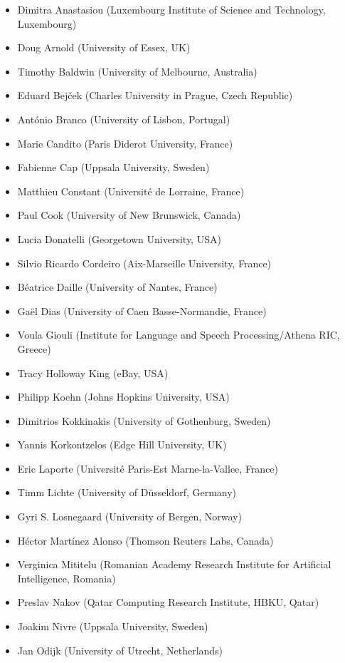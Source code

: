\documentclass[output=paper,
modfonts,
]{langscibook}
\begin{document}
\begin{itemize}
\item Dimitra Anastasiou (Luxembourg Institute of Science and Technology, Luxembourg)
\item Doug Arnold (University of Essex, UK)
\item Timothy Baldwin (University of Melbourne, Australia)
\item Eduard Bejček (Charles University in Prague, Czech Republic)
\item António Branco (University of Lisbon, Portugal)
\item Marie Candito (Paris Diderot University, France)
\item Fabienne Cap (Uppsala University, Sweden)
\item Matthieu Constant (Université de Lorraine, France)
\item Paul Cook (University of New Brunswick, Canada)
\item Lucia Donatelli (Georgetown University, USA)
\item Silvio Ricardo Cordeiro (Aix-Marseille University, France)
\item Béatrice Daille (University of Nantes, France)
\item Gaël Dias (University of Caen Basse-Normandie, France)
\item Voula Giouli (Institute for Language and Speech Processing/Athena RIC, Greece)
\item Tracy Holloway King (eBay, USA)
\item Philipp Koehn (Johns Hopkins University, USA)
\item Dimitrios Kokkinakis (University of Gothenburg, Sweden)
\item Yannis Korkontzelos (Edge Hill University, UK)
\item Eric Laporte (Université Paris-Est Marne-la-Vallee, France)
\item Timm Lichte (University of Düsseldorf, Germany)
\item Gyri S. Losnegaard (University of Bergen, Norway)
\item Héctor Martínez Alonso (Thomson Reuters Labs, Canada)
\item Verginica Mititelu (Romanian Academy Research Institute for Artificial Intelligence, Romania)
\item Preslav Nakov (Qatar Computing Research Institute, HBKU, Qatar)
\item Joakim Nivre (Uppsala University, Sweden)
\item Jan Odijk (University of Utrecht, Netherlands)

\end{itemize}
\end{document}
